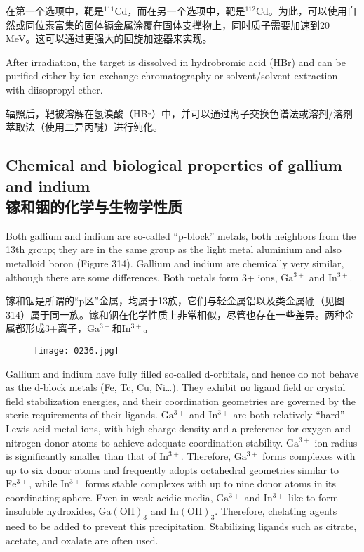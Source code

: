 \documentclass[dvipsnames, svgnames,a4paper,11pt]{article}
\begin{document}
在第一个选项中，靶是\(\mathrm{^{111}Cd}\)，而在另一个选项中，靶是\(\mathrm{^{112}Cd}\)。为此，可以使用自然或同位素富集的固体镉金属涂覆在固体支撑物上，同时质子需要加速到20 MeV。这可以通过更强大的回旋加速器来实现。

After irradiation, the target is dissolved in hydrobromic acid (HBr) and can be purified either by ion-exchange chromatography or solvent/solvent extraction with diisopropyl ether.

辐照后，靶被溶解在氢溴酸（HBr）中，并可以通过离子交换色谱法或溶剂/溶剂萃取法（使用二异丙醚）进行纯化。

\subsection{Chemical and biological properties of gallium and indium\\ 镓和铟的化学与生物学性质}  
Both gallium and indium are so-called “p-block” metals, both neighbors from the 13th group; they are in the same group as the light metal aluminium and also metalloid boron (Figure 314). Gallium and indium are chemically very similar, although there are some differences. Both metals form 3+ ions, \(\mathrm{Ga^{3+}}\) and \(\mathrm{In^{3+}}\).

镓和铟是所谓的“p区”金属，均属于13族，它们与轻金属铝以及类金属硼（见图314）属于同一族。镓和铟在化学性质上非常相似，尽管也存在一些差异。两种金属都形成3+离子，\(\mathrm{Ga^{3+}}\)和\(\mathrm{In^{3+}}\)。

\begin{figure}[h]
	\centering
    \texttt{[image: 0236.jpg]}  
     \label{fig314}
\end{figure}

Gallium and indium have fully filled so-called d-orbitals, and hence do not behave as the d-block metals (Fe, Tc, Cu, Ni…). They exhibit no ligand field or crystal field stabilization energies, and their coordination geometries are governed by the steric requirements of their ligands. \(\mathrm{Ga^{3+}}\) and \(\mathrm{In^{3+}}\) are both relatively “hard” Lewis acid metal ions, with high charge density and a preference for oxygen and nitrogen donor atoms to achieve adequate coordination stability. \(\mathrm{Ga^{3+}}\) ion radius is significantly smaller than that of \(\mathrm{In^{3+}}\). Therefore, \(\mathrm{Ga^{3+}}\) forms complexes with up to six donor atoms and frequently adopts octahedral geometries similar to \(\mathrm{Fe^{3+}}\), while \(\mathrm{In^{3+}}\) forms stable complexes with up to nine donor atoms in its coordinating sphere. Even in weak acidic media, \(\mathrm{Ga^{3+}}\) and \(\mathrm{In^{3+}}\) like to form insoluble hydroxides, \(\mathrm{Ga(OH)_{3}}\) and \(\mathrm{In(OH)_{3}}\). Therefore, chelating agents need to be added to prevent this precipitation. Stabilizing ligands such as citrate, acetate, and oxalate are often used.
\end{document}
